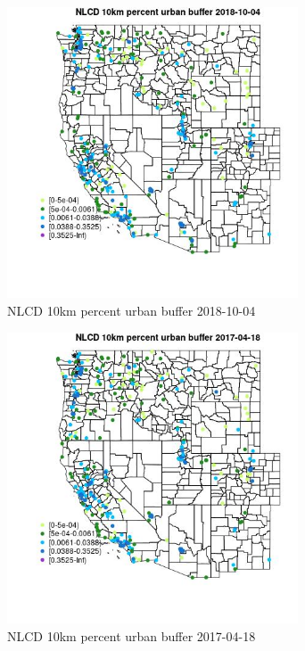 \begin{figure} 
\centering  
\includegraphics[width=0.77\textwidth]{Code_Outputs/Report_ML_input_PM25_Step4_part_f_de_duplicated_aveswNAs_MapObsNLCD_10km_percent_urban_buffer2018-10-04.jpg} 
\caption{\label{fig:Report_ML_input_PM25_Step4_part_f_de_duplicated_aveswNAsMapObsNLCD_10km_percent_urban_buffer2018-10-04}NLCD 10km percent urban buffer 2018-10-04} 
\end{figure} 
 

\begin{figure} 
\centering  
\includegraphics[width=0.77\textwidth]{Code_Outputs/Report_ML_input_PM25_Step4_part_f_de_duplicated_aveswNAs_MapObsNLCD_10km_percent_urban_buffer2017-04-18.jpg} 
\caption{\label{fig:Report_ML_input_PM25_Step4_part_f_de_duplicated_aveswNAsMapObsNLCD_10km_percent_urban_buffer2017-04-18}NLCD 10km percent urban buffer 2017-04-18} 
\end{figure} 
 

